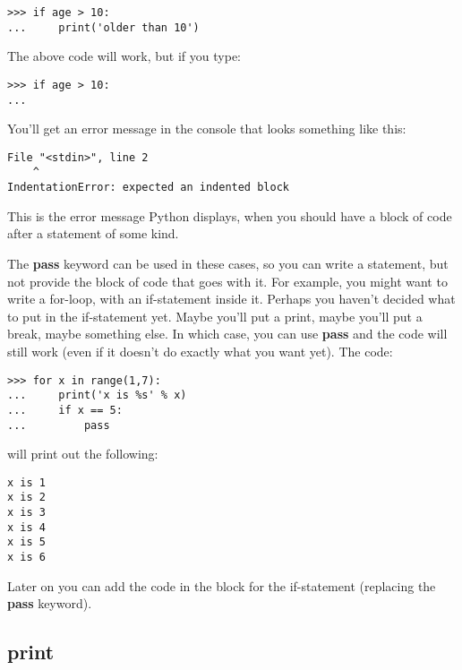 \begin{Verbatim}[frame=single]
>>> if age > 10:
...     print('older than 10')
\end{Verbatim}

\noindent
The above code will work, but if you type:

\begin{Verbatim}[frame=single]
>>> if age > 10:
...
\end{Verbatim}

\noindent
You'll get an error message in the console that looks something like this:

\begin{Verbatim}[frame=single]
  File "<stdin>", line 2
    ^
IndentationError: expected an indented block
\end{Verbatim}

This is the error message Python displays, when you should have a block of code after a statement of some kind.
\par
The \textbf{pass} keyword can be used in these cases, so you can write a statement, but not provide the block of code that goes with it.  For example, you might want to write a for-loop, with an if-statement inside it.  Perhaps you haven't decided what to put in the if-statement yet.  Maybe you'll put a print, maybe you'll put a break, maybe something else.  In which case, you can use \textbf{pass} and the code will still work (even if it doesn't do exactly what you want yet).  The code:

\begin{Verbatim}[frame=single]
>>> for x in range(1,7):
...     print('x is %s' % x)
...     if x == 5:
...         pass
\end{Verbatim}

\noindent
will print out the following:

\begin{Verbatim}[frame=single]
x is 1
x is 2
x is 3
x is 4
x is 5
x is 6
\end{Verbatim}

\noindent
Later on you can add the code in the block for the if-statement (replacing the \textbf{pass} keyword).

\subsection*{print}

